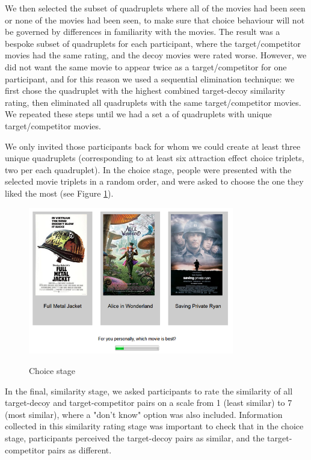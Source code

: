 \documentclass[12pt, a4paper]{article}
\begin{document}
We then selected the subset of quadruplets where all of the movies had been seen or none of the movies had been seen, to make sure that choice behaviour will not be governed by differences in familiarity with the movies. The result was a bespoke subset of quadruplets for each participant, where the target/competitor movies had the same rating, and the decoy movies were rated worse. However, we did not want the same movie to appear twice as a target/competitor for one participant, and for this reason we used a sequential elimination technique: we first chose the quadruplet with the highest combined target-decoy similarity rating, then eliminated all quadruplets with the same target/competitor movies. We repeated these steps until we had a set a of quadruplets with unique target/competitor movies.

We only invited those participants back for whom we could create at least three unique quadruplets (corresponding to at least six attraction effect choice triplets, two per each quadruplet). In the choice stage, people were presented with the selected movie triplets in a random order, and were asked to choose the one they liked the most (see Figure \ref{fig:exp1_screenshot}).

\begin{figure}[htb!]
\centering
\captionsetup{justification=centering}
\caption{Choice stage}
\includegraphics[width=0.8\textwidth]{rsz_exp1_choicestage.png}
\label{fig:exp1_screenshot}
\end{figure}

In the final, similarity stage, we asked participants to rate the similarity of all target-decoy and target-competitor pairs on a scale from 1 (least similar) to 7 (most similar), where a "don't know" option was also included. Information collected in this similarity rating stage was important to check that in the choice stage, participants perceived the target-decoy pairs as similar, and the target-competitor pairs as different.
\end{document}
